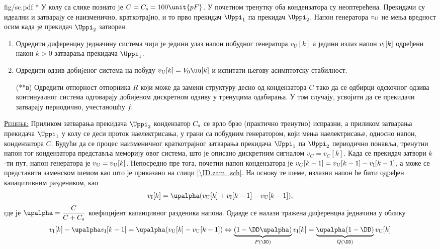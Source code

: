 \begin{slikaDesno}{fig/sc.pdf}
    {\color{red}*}\PID
    У колу са слике познато jе $C = C_{\rm s} = 100\unit{pF}$. 
    У почетном тренутку оба кондензатора су неоптерећена.
Прекидачи су идеални и затвараjу се наизменично,
краткотраjно, и то прво прекидач $\Uppi_1$ па прекидач
$\Uppi_2$. Напон генератора $v_{\rm U}$ не мења вредност осим када
jе прекидач $\Uppi_2$ затворен.
\end{slikaDesno}
\begin{enumerate}[label=(\alph*)]
    \item Одредити диференцну jедначину система чиjи jе
    jедини улаз напон побудног генератора $v_U[k]$ а jедини излаз напон 
    $v_{\rm I}[k]$ одређени након $k > 0$ затварања прекидача $\Uppi_1$.
    \item Одредити одзив добиjеног система на побуду $v_{\rm U}[k] = V_0 \uu[k]$ и 
    испитати његову асимптотску стабилност.
    \item[({\color{red}**}в)] Одредити отпорност отпорника $R$ који може да замени 
    структуру десно од кондензатора $C$ тако да се одбирци одскочног 
    одзива континуалног система одговарају добијеном дискретном одзиву у тренуцима 
    одабирања. У том случају, усвојити да се прекидачи затварају периодично, 
    учестаношћу $f$.
\end{enumerate}
\vspace*{2mm}

\textsc{\underline{Решење:}} Приликом затварања прекидача $\Uppi_2$ кондензатор $C_{\rm s}$ се врло брзо (практично тренутно) испразни, а 
приликом затварања прекидача $\Uppi_1$ у колу се деси проток наелектрисања, у грани са побудним генератором, који мења наелектрисање, односно напон, 
кондензатора $C$. Будући да се процес
наизменичног краткотрајног затварања прекидача $\Uppi_1$ па $\Uppi_2$ периодично понавља, тренутни напон тог кондензатора представља 
меморију овог система, што је описано дискретним сигналом $v_C = {v_C}[k]$. Када се прекидач затвори $k$-ти пут, напон генератора је 
$v_{\rm U} = v_{\rm U}[k]$. Непосредно пре тога, почетни напон кондензатора је $v_{C}[k-1] = v_{\rm U}[k-1] - v_{\rm I}[k-1]$, а
може се представити заменском шемом као што је приказано на слици \ref{\ID.zam_sch}. На основу те шеме, излазни напон ће бити 
одређен капацитивним раздеником, као
\begin{equation}
    v_{\rm I}[k] = \upalpha (v_{\rm U}[k] + v_{\rm I}[k-1] - v_{\rm U}[k-1] ),
\end{equation}
где је $\upalpha =  \dfrac{C}{C + C_{\rm s}}$ коефицијент капаицивног разденика напона.
Одавде се налази тражена диференцна једначина у облику 
\begin{equation}
    v_{\rm I}[k] - \upalpha v_{\rm I}[k-1] = \upalpha( v_{\rm U}[k] - v_{\rm U}[k-1] ) 
    \Leftrightarrow
    \underbrace{( 1 - \DD \upalpha )}_{P(\DD)} v_{\rm I}[k] = \underbrace{\upalpha(1 - \DD)}_{Q(\DD)} v_{\rm U}[k]
\end{equation}

